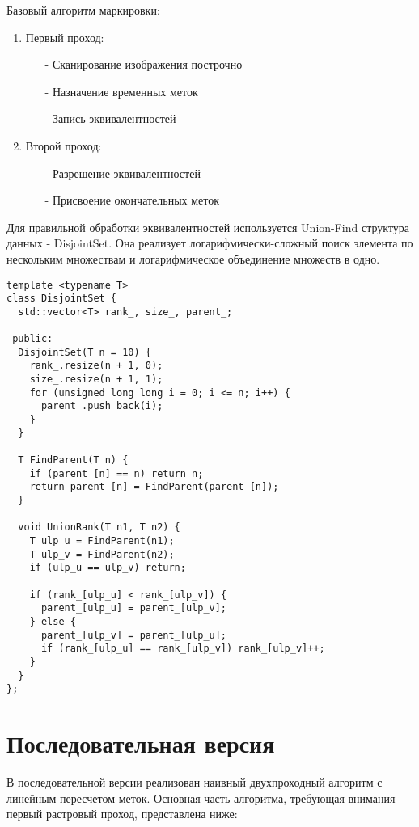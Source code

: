 \documentclass[a4paper,14pt]{article}
\begin{document}
Базовый алгоритм маркировки:
\begin{enumerate}
    \item Первый проход:
    \begin{itemize}
        \item[-] Сканирование изображения построчно
        \item[-] Назначение временных меток
        \item[-] Запись эквивалентностей
    \end{itemize}
    \item Второй проход:
    \begin{itemize}
        \item[-] Разрешение эквивалентностей
        \item[-] Присвоение окончательных меток
    \end{itemize}
\end{enumerate}

Для правильной обработки эквивалентностей используется Union-Find структура данных - DisjointSet. Она реализует логарифмически-сложный поиск элемента по нескольким множествам и логарифмическое объединение множеств в одно. 
\begin{lstlisting}[caption=Disjoint Set (система непересекающихся множеств)]
template <typename T>
class DisjointSet {
  std::vector<T> rank_, size_, parent_;

 public:
  DisjointSet(T n = 10) {
    rank_.resize(n + 1, 0);
    size_.resize(n + 1, 1);
    for (unsigned long long i = 0; i <= n; i++) {
      parent_.push_back(i);
    }
  }

  T FindParent(T n) {
    if (parent_[n] == n) return n;
    return parent_[n] = FindParent(parent_[n]);
  }

  void UnionRank(T n1, T n2) {
    T ulp_u = FindParent(n1);
    T ulp_v = FindParent(n2);
    if (ulp_u == ulp_v) return;
    
    if (rank_[ulp_u] < rank_[ulp_v]) {
      parent_[ulp_u] = parent_[ulp_v];
    } else {
      parent_[ulp_v] = parent_[ulp_u];
      if (rank_[ulp_u] == rank_[ulp_v]) rank_[ulp_v]++;
    }
  }
};
\end{lstlisting}

\section{ Последовательная версия }
В последовательной версии реализован наивный двухпроходный алгоритм с линейным пересчетом меток. Основная часть алгоритма, требующая внимания - первый растровый проход, представлена ниже:
\end{document}

